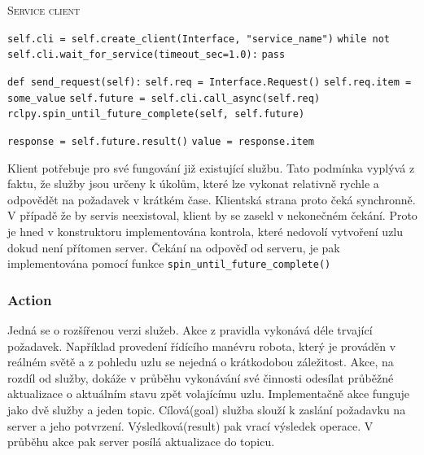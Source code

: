 \begin{algorithm}[h!]
	\label{}
	\caption{\textsc{Service client}}
	
	\DontPrintSemicolon
	\SetAlgoNoLine
	\SetNlSty{}{}{:}
	\SetNlSkip{-1.1em}
	
	\BlankLine \Indp\Indpp
	
	\texttt{self.cli = self.create\_client(Interface, "service\_name")}\;
	\texttt{while not self.cli.wait\_for\_service(timeout\_sec=1.0):}\;
	\Indp\Indp
	\texttt{pass}\;
	\Indm\Indm

	\BlankLine
	\texttt{def send\_request(self):}\;
	\Indp\Indp
	\texttt{self.req = Interface.Request()}\;
	\texttt{self.req.item = some\_value}\;
	\texttt{self.future = self.cli.call\_async(self.req)}\;
	\texttt{rclpy.spin\_until\_future\_complete(self, self.future)}\;
	
	\BlankLine
	\texttt{response = self.future.result()}\;
	\texttt{value = response.item}\;
\end{algorithm}

Klient potřebuje pro své fungování již existující službu. Tato podmínka vyplývá z faktu, že služby jsou určeny k úkolům, které lze vykonat relativně rychle a odpovědět na požadavek v krátkém čase. Klientská strana proto čeká synchronně. V případě že by servis neexistoval, klient by se zasekl v nekonečném čekání. Proto je hned v konstruktoru implementována kontrola, které nedovolí vytvoření uzlu dokud není přítomen server. Čekání na odpověď od serveru, je pak implementována pomocí funkce \verb|spin_until_future_complete()| \cite{ros2_documentation}

\newpage
\subsubsection*{Action} \label{theory:action}
Jedná se o rozšířenou verzi služeb. Akce z pravidla vykonává déle trvající požadavek. Například provedení řídícího manévru robota, který je prováděn v reálném světě a z pohledu uzlu se nejedná o krátkodobou záležitost. Akce, na rozdíl od služby, dokáže v průběhu vykonávání své činnosti odesílat průběžné aktualizace o aktuálním stavu zpět volajícímu uzlu. \cite[str:~6]{ros2_introduction} Implementačně akce funguje jako dvě služby a jeden topic. Cílová(goal) služba slouží k zaslání požadavku na server a jeho potvrzení. Výsledková(result) pak vrací výsledek operace. V průběhu akce pak server posílá aktualizace do topicu. \cite{ros2_documentation}

